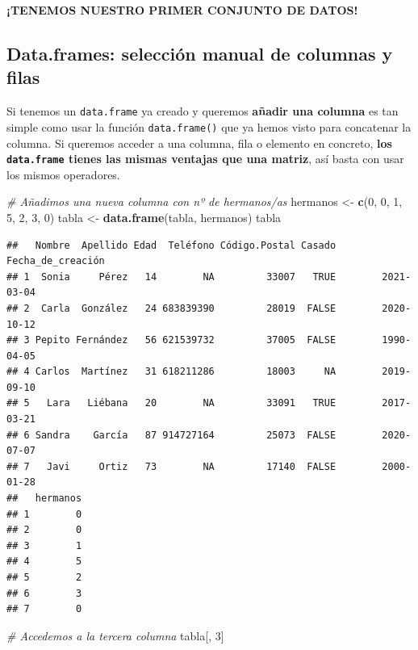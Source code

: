 \documentclass[11pt,]{book}
\newenvironment{Shaded}{\begin{snugshade}}{\end{snugshade}}
\newcommand{\CommentTok}[1]{\textcolor[rgb]{0.37,0.37,0.37}{\textit{#1}}}
\newcommand{\DecValTok}[1]{\textcolor[rgb]{0.06,0.06,0.06}{#1}}
\newcommand{\KeywordTok}[1]{\textcolor[rgb]{0.27,0.27,0.27}{\textbf{#1}}}
\newcommand{\NormalTok}[1]{#1}
\newcommand{\StringTok}[1]{\textcolor[rgb]{0.5,0.5,0.5}{#1}}
\begin{document}
\textbf{¡TENEMOS NUESTRO PRIMER CONJUNTO DE DATOS!}

\hypertarget{data.frames-selecciuxf3n-manual-de-columnas-y-filas}{%
\subsection{Data.frames: selección manual de columnas y filas}\label{data.frames-selecciuxf3n-manual-de-columnas-y-filas}}

Si tenemos un \texttt{data.frame} ya creado y queremos \textbf{añadir una columna} es tan simple como usar la función \texttt{data.frame()} que ya hemos visto para concatenar la columna. Si queremos acceder a una columna, fila o elemento en concreto, \textbf{los \texttt{data.frame} tienes las mismas ventajas que una matriz}, así basta con usar los mismos operadores.

\begin{Shaded}
\begin{Highlighting}[]
\CommentTok{# Añadimos una nueva columna con nº de hermanos/as}
\NormalTok{hermanos <-}\StringTok{ }\KeywordTok{c}\NormalTok{(}\DecValTok{0}\NormalTok{, }\DecValTok{0}\NormalTok{, }\DecValTok{1}\NormalTok{, }\DecValTok{5}\NormalTok{, }\DecValTok{2}\NormalTok{, }\DecValTok{3}\NormalTok{, }\DecValTok{0}\NormalTok{)}
\NormalTok{tabla <-}\StringTok{ }\KeywordTok{data.frame}\NormalTok{(tabla, hermanos)}
\NormalTok{tabla}
\end{Highlighting}
\end{Shaded}

\begin{verbatim}
##   Nombre  Apellido Edad  Teléfono Código.Postal Casado Fecha_de_creación
## 1  Sonia     Pérez   14        NA         33007   TRUE        2021-03-04
## 2  Carla  González   24 683839390         28019  FALSE        2020-10-12
## 3 Pepito Fernández   56 621539732         37005  FALSE        1990-04-05
## 4 Carlos  Martínez   31 618211286         18003     NA        2019-09-10
## 5   Lara   Liébana   20        NA         33091   TRUE        2017-03-21
## 6 Sandra    García   87 914727164         25073  FALSE        2020-07-07
## 7   Javi     Ortiz   73        NA         17140  FALSE        2000-01-28
##   hermanos
## 1        0
## 2        0
## 3        1
## 4        5
## 5        2
## 6        3
## 7        0
\end{verbatim}

\begin{Shaded}
\begin{Highlighting}[]
\CommentTok{# Accedemos a la tercera columna}
\NormalTok{tabla[, }\DecValTok{3}\NormalTok{]}
\end{Highlighting}
\end{Shaded}
\end{document}
